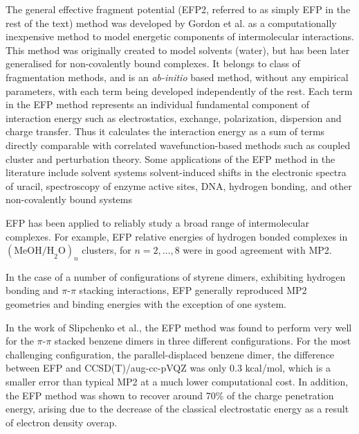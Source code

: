 The general effective fragment potential (EFP2, referred to as simply EFP in the rest of the text) method was developed by Gordon et al. 
\cite{Jensen1998a, Gordon2001a, Gordon2009a, Mullin2009a, Gordon2012a} 
as a computationally inexpensive method to model energetic components of intermolecular interactions. 
This method was originally created to model solvents (water),
\cite{Day1996a, Chen1996a, Adamovic2006a} 
but has been later generalised for non-covalently bound complexes.
\cite{Gordon2007a, Ghosh2010a}
It belongs to class of fragmentation methods, and is an \emph{ab-initio} based method, without any empirical parameters, with each term being developed independently of the rest. 
Each term in the EFP method represents an individual fundamental component of interaction energy such as electrostatics, exchange, polarization, dispersion and charge transfer. 
Thus it calculates the interaction energy as a sum of terms directly comparable with correlated wavefunction-based methods such as coupled cluster and perturbation theory.
Some applications of the EFP method in the literature include solvent systems
\cite{Chen1996a, Day1996a, Day1997a, Krauss1997a, Merrill1998a, Day2000a, Adamovic2006a}
solvent-induced shifts in the electronic spectra of uracil,
\cite{DeFusco2011a}
spectroscopy of enzyme active sites,
\cite{Krauss1995a, Krauss1998a}
DNA,
\cite{Ghosh2010a}
hydrogen bonding,
\cite{Jensen1994a}
and other non-covalently bound systems
\cite{Gordon2009a, Gordon2013a, Wladkowski1995a}

EFP has been applied to reliably study a broad range of intermolecular complexes. For example, EFP relative energies of hydrogen bonded complexes in $ (\text{MeOH/H}_2\text{O})_{n} $ clusters, for $ n = 2, \ldots, 8 $ were in good agreement with MP2.
\cite{Adamovic2006a}

In the case of a number of configurations of styrene dimers, exhibiting hydrogen bonding and  $\pi$-$\pi$ stacking interactions, EFP generally reproduced MP2 geometries and binding energies with the exception of one system.
\cite{Adamovic2006b}


In the work of Slipchenko et al., the EFP method was found to perform very well for the $\pi$-$\pi$ stacked benzene dimers in three different configurations.
For the most challenging configuration, the parallel-displaced benzene dimer, the difference between EFP and CCSD(T)/aug-cc-pVQZ was only 0.3 kcal/mol, which is a smaller error than typical MP2 at a much lower computational cost.
In addition, the EFP method was shown to recover around 70\% of the charge penetration energy, arising due to the decrease of the classical electrostatic energy as a result of electron density overap.
\cite{Slipchenko2007a}


